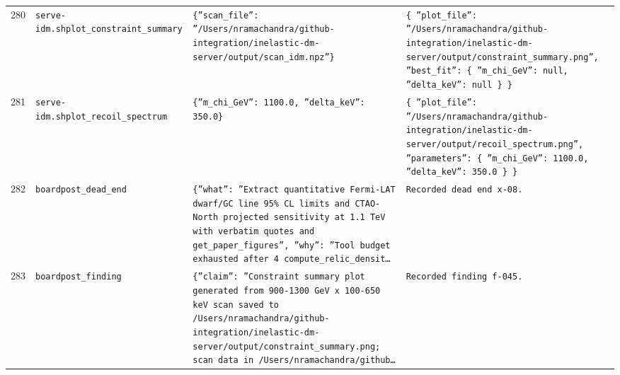 \documentclass[11pt,a4paper]{article}
\begin{document}
\begin{longtable}{@{}p{}p{}p{}p{}@{}}
280 & \texttt{serve-idm.sh}\newline\texttt{plot\_\allowbreak{}constraint\_\allowbreak{}summary} & \texttt{\{''scan\_\allowbreak{}file'':\allowbreak{} ''/\allowbreak{}Users/\allowbreak{}nramachandra/\allowbreak{}github-integration/\allowbreak{}inelastic-dm-server/\allowbreak{}output/\allowbreak{}scan\_\allowbreak{}idm.npz''\}\allowbreak{}} & \texttt{\{   ''plot\_\allowbreak{}file'':\allowbreak{} ''/\allowbreak{}Users/\allowbreak{}nramachandra/\allowbreak{}github-integration/\allowbreak{}inelastic-dm-server/\allowbreak{}output/\allowbreak{}constraint\_\allowbreak{}summary.png'',\allowbreak{}   ''best\_\allowbreak{}fit'':\allowbreak{} \{     ''m\_\allowbreak{}chi\_\allowbreak{}GeV'':\allowbreak{} null,\allowbreak{}     ''delta\_\allowbreak{}keV'':\allowbreak{} null   \}\allowbreak{} \}\allowbreak{}} \\
281 & \texttt{serve-idm.sh}\newline\texttt{plot\_\allowbreak{}recoil\_\allowbreak{}spectrum} & \texttt{\{''m\_\allowbreak{}chi\_\allowbreak{}GeV'':\allowbreak{} 1100.0,\allowbreak{} ''delta\_\allowbreak{}keV'':\allowbreak{} 350.0\}\allowbreak{}} & \texttt{\{   ''plot\_\allowbreak{}file'':\allowbreak{} ''/\allowbreak{}Users/\allowbreak{}nramachandra/\allowbreak{}github-integration/\allowbreak{}inelastic-dm-server/\allowbreak{}output/\allowbreak{}recoil\_\allowbreak{}spectrum.png'',\allowbreak{}   ''parameters'':\allowbreak{} \{     ''m\_\allowbreak{}chi\_\allowbreak{}GeV'':\allowbreak{} 1100.0,\allowbreak{}     ''delta\_\allowbreak{}keV'':\allowbreak{} 350.0   \}\allowbreak{} \}\allowbreak{}} \\
282 & \texttt{board}\newline\texttt{post\_\allowbreak{}dead\_\allowbreak{}end} & \texttt{\{''what'':\allowbreak{} ''Extract quantitative Fermi-LAT dwarf/\allowbreak{}GC line 95\% CL limits and CTAO-North projected sensitivity at 1.1 TeV with verbatim quotes and get\_\allowbreak{}paper\_\allowbreak{}figures'',\allowbreak{} ''why'':\allowbreak{} ''Tool budget exhausted after 4 compute\_\allowbreak{}relic\_\allowbreak{}densit\ldots{}\allowbreak{}} & \texttt{Recorded dead end x-08.} \\
283 & \texttt{board}\newline\texttt{post\_\allowbreak{}finding} & \texttt{\{''claim'':\allowbreak{} ''Constraint summary plot generated from 900-1300 GeV x 100-650 keV scan saved to /\allowbreak{}Users/\allowbreak{}nramachandra/\allowbreak{}github-integration/\allowbreak{}inelastic-dm-server/\allowbreak{}output/\allowbreak{}constraint\_\allowbreak{}summary.png;\allowbreak{} scan data in /\allowbreak{}Users/\allowbreak{}nramachandra/\allowbreak{}github\ldots{}\allowbreak{}} & \texttt{Recorded finding f-045.} \\

\end{longtable}
\end{document}
